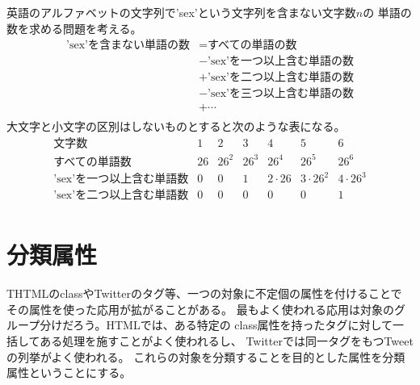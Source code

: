 	英語のアルファベットの文字列で'sex'という文字列を含まない文字数$n$の
	単語の数を求める問題を考える。
	\begin{equation*}\begin{split} %
		\text{'sex'を含まない単語の数} &= \text{すべての単語の数} \\
		& - \text{'sex'を一つ以上含む単語の数} \\
		& + \text{'sex'を二つ以上含む単語の数} \\
		& - \text{'sex'を三つ以上含む単語の数} \\
		& + \cdots \\
	\end{split}\end{equation*} %
	大文字と小文字の区別はしないものとすると次のような表になる。
	\begin{equation*}\begin{array}{rrrrrrr} %
		\text{文字数} & 1 & 2 & 3 & 4 & 5 & 6 \\
		\text{すべての単語数} & 26 & 26^2 & 26^3 & 26^4 & 26^5 & 26^6 \\
		\text{'sex'を一つ以上含む単語数} & 0 & 0 & 1 & 2\cdot26 & 3\cdot26^2 & 4\cdot26^3 \\
		\text{'sex'を二つ以上含む単語数} & 0 & 0 & 0 & 0 & 0 & 1 \\
	\end{array}\end{equation*} %

\section{分類属性}\label{s1:分類属性} %
	THTMLのclassやTwitterのタグ等、一つの対象に不定個の属性を付けることで
	その属性を使った応用が拡がることがある。
	最もよく使われる応用は対象のグループ分けだろう。HTMLでは、ある特定の
	class属性を持ったタグに対して一括してある処理を施すことがよく使われるし、
	Twitterでは同一タグをもつTweetの列挙がよく使われる。
	これらの対象を分類することを目的とした属性を分類属性ということにする。

